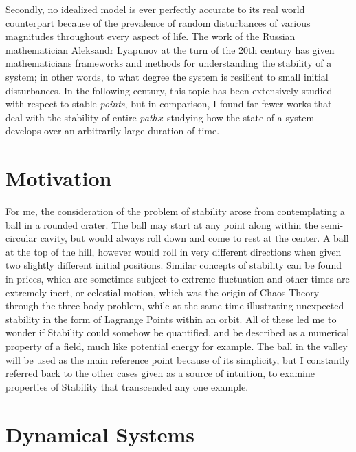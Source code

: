 \documentclass{article}
\theoremstyle{definition}
\theoremstyle{remark}
\begin{document}
Secondly, no idealized model is ever perfectly accurate to its real world counterpart
because of the prevalence of random disturbances of various magnitudes throughout
every aspect of life. The work of the Russian mathematician
Aleksandr Lyapunov at the turn of the 20th century has given mathematicians 
frameworks and methods for understanding the stability of a system; 
in other words, to what degree the system is  
resilient to small initial disturbances. In the following century, this
topic has been extensively studied with respect to stable \textit{points},
but in comparison, I found far fewer works that deal with the
stability of entire \textit{paths}: studying how the state of a system
develops over an arbitrarily large duration of time.

\section{Motivation}

For me, the consideration of the problem of stability arose from
contemplating a ball in a rounded crater. The ball may start at any
point along within the semi-circular cavity, but would always roll
down and come to rest at the center. A ball at the top of the hill, however
would roll in very different directions when given two slightly different initial positions.
Similar concepts of stability can be found in prices, which are sometimes subject to extreme 
fluctuation and other times are extremely inert, or celestial motion, which was
the origin of Chaos Theory through the three-body problem, while at the same time 
illustrating unexpected stability in the form of Lagrange Points within an orbit. 
All of these led me to wonder if Stability could somehow be quantified, and be described
as a numerical property of a field, much like potential energy for example. The ball in the valley
will be used as the main reference point because of its simplicity, but I constantly referred back 
to the other cases given as a source of intuition, to examine properties of Stability that
transcended any one example.

\section{Dynamical Systems}
\end{document}
